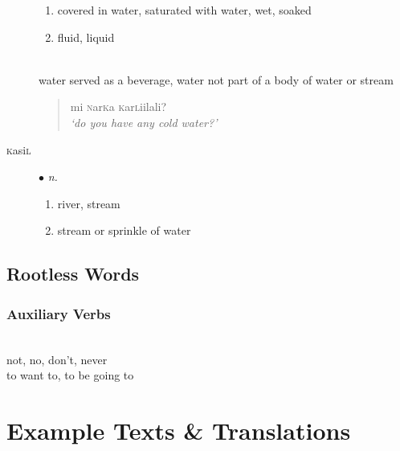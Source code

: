 \documentclass[a4paper,10pt,twoside,openright]{memoir}
\newcommand{\famword}[5]{#1\textsc{#2}#3\textsc{#4}#5}
\begin{document}
\begin{multicols*}{2}
\begin{description}
\begin{enumerate}
        \item covered in water, saturated with water, wet, soaked
        \item fluid, liquid
    \end{enumerate}
    \newentry{\famword{}{k}{ar}{l}{i}}{n.}\\
        water served as a beverage, water not part of a body of water or stream
        \begin{quote}
            mi \textsc{n}ar\textsc{k}a \textsc{k}ar\textsc{l}iilali?\\
            \textit{`do you have any cold water?'}
        \end{quote}
    \item[\textsc{k}asi\textsc{l}] $\bullet$ \textit{n.}\hfill
        \begin{enumerate}
            \item river, stream
            \item stream or sprinkle of water
        \end{enumerate}
\end{description}
\end{multicols*}

\chapter{Rootless Words}
\begin{multicols*}{2}
\section{Auxiliary Verbs}
\begin{description}
    \\
    not, no, don't, never
    \\
    to want to, to be going to 
\end{description}
\end{multicols*}

\part{Example Texts \& Translations}

\end{document}

